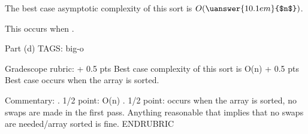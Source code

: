 \begin{parts}
\begin{framed}
\bigskip
The best case asymptotic complexity of this sort is
$O(\uanswer{10.1em}{$n$})$.

\medskip\bigskip
This occurs when .
\end{framed}

\RUBRIC
Part (d)
TAGS: big-o

Gradescope rubric:
+ 0.5 pts Best case complexity of this sort is O(n)
+ 0.5 pts Best case occurs when the array is sorted.

Commentary:
. 1/2 point: O(n)
. 1/2 point: occurs when the array is sorted, no swaps are made in
  the first pass. Anything reasonable that implies that no swaps are
  needed/array sorted is fine.
ENDRUBRIC

\end{parts}
\egroup